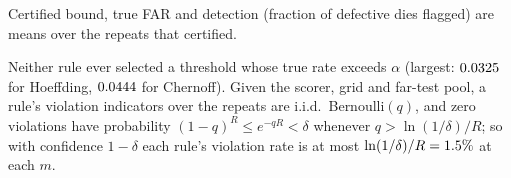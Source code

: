 \begin{center}
\small
{}

{\small Certified bound, true FAR and detection (fraction of defective dies flagged) are means over
the repeats that certified.}
\end{center}

Neither rule ever selected a threshold whose true rate exceeds $\alpha$ (largest: $0.0325$
for Hoeffding, $0.0444$ for Chernoff). Given the scorer, grid and far-test pool, a
rule's violation indicators over the repeats are i.i.d.\ Bernoulli$(q)$, and zero violations have
probability $(1-q)^R\le e^{-qR}<\delta$ whenever $q>\ln(1/\delta)/R$; so with confidence $1-\delta$ each
rule's violation rate is at most $\ln(1/\delta)/R=1.5\%$ at each $m$.

